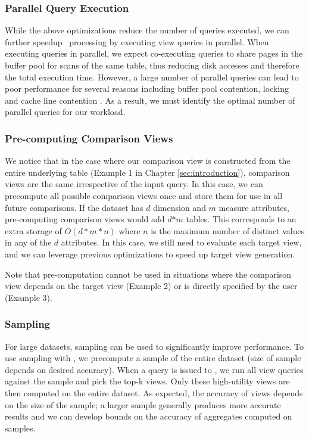   \subsubsection {Parallel Query Execution}
  \label{subsec:parallel_exec}
  While the above optimizations reduce the number of queries executed, we can
  further speedup \SeeDB\ processing by executing view queries in parallel. When
  executing queries in parallel, we expect co-executing queries to share pages in the
  buffer pool for scans of the same table, thus reducing disk accesses and
  therefore the total execution time. 
  However, a large number of parallel queries can lead to poor performance for
  several reasons including buffer pool contention, locking and cache line
  contention \cite{Postgres_wiki}. 
  As a result, we must identify the optimal number of parallel queries for our workload.
  

 \subsubsection {Pre-computing Comparison Views}
  We notice that in the case where our comparison view is constructed from the
  entire underlying table (Example 1 in Chapter \ref{sec:introduction}),
  comparison views are the same irrespective of the input query.
  In this case, we can precompute all possible comparison views once and store
  them for use in all future comparisons. If the dataset has $d$ dimension and
  $m$ measure attributes, pre-computing comparison views would add $d$$\ast$$m$
  tables. This corresponds to an extra storage of $O(d\ast m \ast n)$ where $n$
  is the maximum number of distinct values in any of the $d$ attributes. In this
  case, we still need to evaluate each target view, and we can leverage previous
  optimizations to speed up target view generation.
  
  Note that pre-computation cannot be used in situations where the comparison
  view depends on the target view (Example 2) or is directly specified by the
  user (Example 3).
  
\subsubsection {Sampling}
  For large datasets, sampling can be used to significantly improve
  performance. To use sampling with \SeeDB, we precompute a sample of the
  entire dataset (size of sample depends on desired accuracy). When a query is
  issued to \SeeDB, we run all view queries against the sample and pick the
  top-k views. Only these high-utility views are then computed on the entire
  dataset. As expected, the accuracy of views depends on the size of the sample;
  a larger sample generally produces more accurate results and we can develop
  bounds on the accuracy of aggregates computed on samples.

